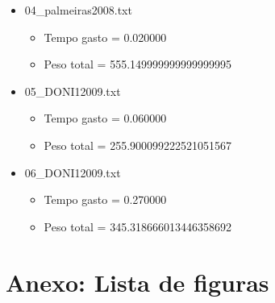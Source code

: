 \documentclass[12pt,a4paper]{article}
\begin{document}
\begin{itemize}
\begin{itemize}
\begin{itemize}
\end{itemize}
\item 04\_palmeiras2008.txt
\begin{itemize}
\item Tempo gasto = 0.020000
\item Peso total = 555.149999999999999995
\end{itemize}
\item 05\_DONI12009.txt
\begin{itemize}
\item Tempo gasto = 0.060000
\item Peso total = 255.900099222521051567
\end{itemize}
\item 06\_DONI12009.txt
\begin{itemize}
\item Tempo gasto = 0.270000
\item Peso total = 345.318666013446358692
\end{itemize}
\end{itemize}
\end{itemize}

%
%



\section{Anexo: Lista de figuras}

\end{document}

